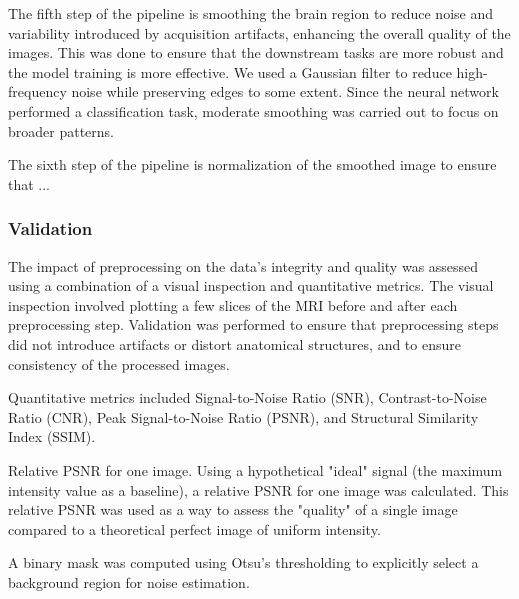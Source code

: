 The fifth step of the pipeline is smoothing the brain region to reduce noise and variability introduced by acquisition artifacts, enhancing the overall quality of the images. This was done to ensure that the downstream tasks are more robust and the model training is more effective. We used a Gaussian filter to reduce high-frequency noise while preserving edges to some extent. Since the neural network performed a classification task, moderate smoothing was carried out to focus on broader patterns.

The sixth step of the pipeline is normalization of the smoothed image to ensure that ...

\subsubsection{Validation}

The impact of preprocessing on the data's integrity and quality was assessed using a combination of a visual inspection and quantitative metrics. The visual inspection involved plotting a few slices of the MRI before and after each preprocessing step. Validation was performed to ensure that preprocessing steps did not introduce artifacts or distort anatomical structures, and to ensure consistency of the processed images.

Quantitative metrics included Signal-to-Noise Ratio (SNR), Contrast-to-Noise Ratio (CNR), Peak Signal-to-Noise Ratio (PSNR), and 
Structural Similarity Index (SSIM). 

Relative PSNR for one image. Using a hypothetical "ideal" signal (the maximum intensity value as a baseline), a relative PSNR for one image was calculated. This relative PSNR was used as a way to assess the "quality" of a single image compared to a theoretical perfect image of uniform intensity.

A binary mask was computed using Otsu's thresholding to explicitly select a background region for noise estimation.

